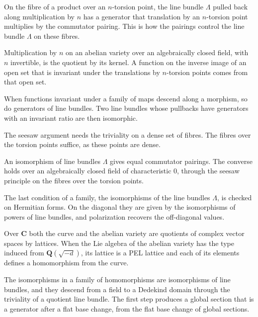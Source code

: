 On the fibre of a product over an $n$-torsion point, the line bundle $\Lambda$ pulled back along multiplication by $n$
has a generator that translation by an $n$-torsion point multiplies by the commutator pairing. This is how the pairings
control the line bundle $\Lambda$ on these fibres.

Multiplication by $n$ on an abelian variety over an algebraically closed field, with $n$ invertible, is the quotient by
its kernel. A function on the inverse image of an open set that is invariant under the translations by $n$-torsion points
comes from that open set.

When functions invariant under a family of maps descend along a morphism, so do generators of line bundles. Two line
bundles whose pullbacks have generators with an invariant ratio are then isomorphic.

The seesaw argument needs the triviality on a dense set of fibres. The fibres over the torsion points suffice, as these
points are dense.

An isomorphism of line bundles $\Lambda$ gives equal commutator pairings. The converse holds over an algebraically closed
field of characteristic $0$, through the seesaw principle on the fibres over the torsion points.

The last condition of a family, the isomorphisms of the line bundles $\Lambda$, is checked on Hermitian forms. On the
diagonal they are given by the isomorphisms of powers of line bundles, and polarization recovers the off-diagonal
values.

Over $\mathbf C$ both the curve and the abelian variety are quotients of complex vector spaces by lattices. When the
Lie algebra of the abelian variety has the type induced from $\mathbf Q(\sqrt{-d})$, its lattice is a PEL lattice and
each of its elements defines a homomorphism from the curve.

The isomorphisms in a family of homomorphisms are isomorphisms of line bundles, and they descend from a field to a
Dedekind domain through the triviality of a quotient line bundle. The first step produces a global section that is a
generator after a flat base change, from the flat base change of global sections.

